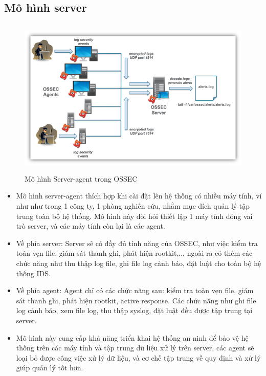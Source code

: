 	\subsection{Mô hình server}
	\begin{figure}[h!]
	\centering 
	\includegraphics[width=6in,height=3in,keepaspectratio=true]{server-agent.png}
	\caption{Mô hình Server-agent trong OSSEC}
\end{figure}
	\begin{itemize}
	  \item Mô hình server-agent thích hợp khi cài đặt lên hệ thống có nhiều máy tính, ví
	như như trong 1 công ty, 1 phòng nghiên cứu, nhằm mục đích quản lý tập trung
	toàn bộ hệ thống. Mô hình này đòi hỏi thiết lập 1 máy tính đóng vai trò server, và các máy tính còn lại là các agent.
	\item Về phía server: Server sẽ có đầy đủ tính năng của OSSEC, như việc kiểm tra
	 toàn vẹn file, giám sát thanh ghi, phát hiện rootkit,... ngoài ra có thêm các
	 chức năng như thu thập log file, ghi file log cảnh báo, đặt luật cho toàn bộ hệ thống IDS.
	 \item Về phía agent:
Agent chỉ có các chức năng sau:
kiểm tra toàn vẹn file,
giám sát thanh ghi,
phát hiện rootkit,
active response.
Các chức năng như ghi file log cảnh báo, xem file log, thu thập syslog, đặt luật
đều được tập trung tại server.
\item Mô hình này cung cấp khả năng triển khai hệ thống an ninh để bảo vệ hệ thống
trên các máy tính và tập trung dữ liệu xử lý trên server, các agent sẽ loại bỏ
được công việc xử lý dữ liệu, và cơ chế tập trung về quy định và xử lý giúp quản
lý tốt hơn.   
	\end{itemize}
  

